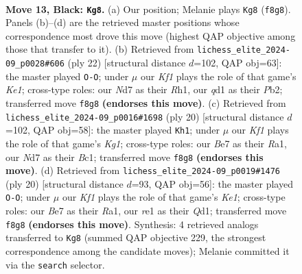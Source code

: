 \documentclass[11pt]{article}
\begin{document}
\clearpage

\begin{figure}[p]\centering
\begin{subfigure}{0.46\textwidth}\centering
\resizebox{\linewidth}{!}{%
\newchessgame
\chessboard[
  setfen={r1bqrk2/pp1nbppp/2n1p3/8/2Pp2P1/1P3N1B/P2P1P1P/RNBQR1K1 b - - 1 13},
  showmover=false,
  pgfstyle=straightmove, color=movearrow, markmove={f8-g8}
]}
\caption{}
\end{subfigure}\hfill
\begin{subfigure}{0.46\textwidth}\centering
\resizebox{\linewidth}{!}{%
\newchessgame
\chessboard[
  setfen={r1bq1rk1/1p2ppbp/2np1np1/p7/2P1P3/1NN1BP2/PP1QB1PP/R3K2R w KQ - 0 12},
  showmover=false,
  pgfstyle=straightmove, color=movearrow, markmove={e1-g1}
]}
\caption{}
\end{subfigure}
\\[4pt]
\begin{subfigure}{0.46\textwidth}\centering
\resizebox{\linewidth}{!}{%
\newchessgame
\chessboard[
  setfen={rnbqr1k1/1p3pbp/p1pp1np1/8/2P1P3/2N2P2/PPN1B1PP/R1BQ1RK1 w - - 0 11},
  showmover=false,
  pgfstyle=straightmove, color=movearrow, markmove={g1-h1}
]}
\caption{}
\end{subfigure}\hfill
\begin{subfigure}{0.46\textwidth}\centering
\resizebox{\linewidth}{!}{%
\newchessgame
\chessboard[
  setfen={r2q1rk1/pppb1pbp/2np1np1/8/2P1P3/2N5/PPN1BPPP/R1BQK2R w KQ - 5 11},
  showmover=false,
  pgfstyle=straightmove, color=movearrow, markmove={e1-g1}
]}
\caption{}
\end{subfigure}
\caption{\textbf{Move 13, Black: \texttt{Kg8}.} (a) Our position; Melanie plays \texttt{Kg8} (\texttt{f8g8}). Panels (b)--(d) are the retrieved master positions whose correspondence most drove this move (highest QAP objective among those that transfer to it). (b) Retrieved from \texttt{lichess\_elite\_2024-09\_p0028\#606} (ply 22) [structural distance $d$=102, QAP obj=63]: the master played \texttt{O-O}; under $\mu$ our \emph{Kf1} plays the role of that game's \emph{Ke1}; cross-type roles: our \emph{N}d7 as their \emph{R}h1, our \emph{q}d1 as their \emph{P}b2; transferred move \texttt{f8g8} \textbf{(endorses this move)}. (c) Retrieved from \texttt{lichess\_elite\_2024-09\_p0016\#1698} (ply 20) [structural distance $d$=102, QAP obj=58]: the master played \texttt{Kh1}; under $\mu$ our \emph{Kf1} plays the role of that game's \emph{Kg1}; cross-type roles: our \emph{B}e7 as their \emph{R}a1, our \emph{N}d7 as their \emph{B}c1; transferred move \texttt{f8g8} \textbf{(endorses this move)}. (d) Retrieved from \texttt{lichess\_elite\_2024-09\_p0019\#1476} (ply 20) [structural distance $d$=93, QAP obj=56]: the master played \texttt{O-O}; under $\mu$ our \emph{Kf1} plays the role of that game's \emph{Ke1}; cross-type roles: our \emph{B}e7 as their \emph{R}a1, our \emph{r}e1 as their \emph{Q}d1; transferred move \texttt{f8g8} \textbf{(endorses this move)}. Synthesis: 4 retrieved analogs transferred to \texttt{Kg8} (summed QAP objective 229, the strongest correspondence among the candidate moves); Melanie committed it via the \texttt{search} selector.}
\label{fig:thought-m25}
\end{figure}
\end{document}
